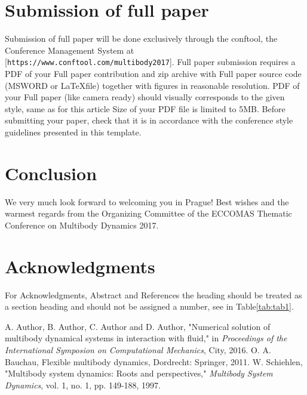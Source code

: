 \documentclass{mbd_fullpaper}
\begin{document}
\section{Submission of full paper}

Submission of full paper will be done exclusively through the conftool, the Conference Management System at [\texttt{https://www.conftool.com/multibody2017}]. Full paper submission requires a PDF of your Full paper contribution and zip archive with Full paper source code (MSWORD or \LaTeX file) together with figures in reasonable resolution. PDF of your Full paper (like camera ready) should visually corresponds to the given style, same as for this article Size of your PDF file is limited to 5MB. Before submitting your paper, check that it is in accordance with the conference style guidelines presented in this template.

\section{Conclusion}
We very much look forward to welcoming you in Prague! Best wishes and the warmest regards from the Organizing Committee of the ECCOMAS Thematic Conference on Multibody Dynamics 2017.

\section*{Acknowledgments}

For Acknowledgments, Abstract and References the heading should be treated as a section heading and should not be assigned a number, see in Table\ref{tab:tab1}.


\begin{thebibliography}{mbd}

A. Author, B. Author, C. Author and D. Author, "Numerical solution of multibody dynamical systems in interaction with fluid," in \textit{Proceedings of the International Symposion on Computational Mechanics}, City, 2016.
O. A. Bauchau, Flexible multibody dynamics, Dordrecht: Springer, 2011.
W. Schiehlen, "Multibody system dynamics: Roots and perspectives," \textit{Multibody System Dynamics}, vol. 1, no. 1, pp. 149-188, 1997.

\end{thebibliography}
\end{document}

